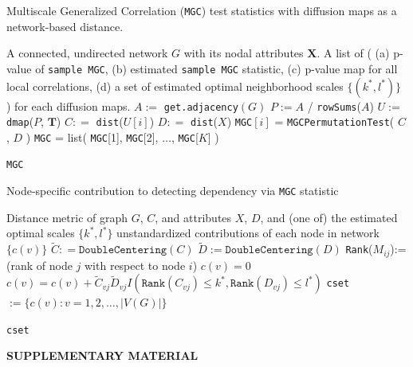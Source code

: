 \documentclass[11pt]{article}
\theoremstyle{definition}
\begin{document}
\begin{algorithm}[H]
	\caption{Multiscale Generalized Correlation (\texttt{MGC}) test statistics with diffusion maps as a network-based distance.}
	\begin{algorithmic}[1]
		\Require A connected, undirected network $G$ with its nodal attributes $\mathbf{X}$.
		\Ensure A list of \big(  (a) p-value of \texttt{sample MGC}, (b) estimated \texttt{sample MGC} statistic, (c) p-value map for all local correlations, (d) a set of estimated optimal neighborhood scales $\{  (k^{*}, l^{*}  ) \}$  \big) for each diffusion maps.
		\State $A :=$ \texttt{get.adjacency}$(G)$
		\State $P := A $ / \texttt{rowSums}($A$) 
		\State $U :=$ \texttt{dmap}($P$, $\mathbf{T}$) 
		\Begin
		\State $C : =$  \texttt{dist}($U[i]$) 
		\State $D : =$ \texttt{dist}($X$) 
		\State \texttt{MGC}$[i]$ = \texttt{MGCPermutationTest}( $C$, $D$ ) 
		\End
		\EndFor
		\State \texttt{MGC} = list( \texttt{MGC}[1], \texttt{MGC}[2], $\ldots$, \texttt{MGC}[$K$]  )
		
		\Return \texttt{MGC}
		\EndFunction
	\end{algorithmic}
\end{algorithm}

\begin{algorithm}[H]
	\caption{Node-specific contribution to detecting dependency via \texttt{MGC} statistic}
	\begin{algorithmic}[1]
		\Require Distance metric of graph $G$, $C$, and attributes $X$, $D$, and (one of) the estimated optimal scales $\{ k^{*}, l^{*} \}$ 
		\Ensure  unstandardized contributions of each node in network $\{  c(v) \}$
		\State $\tilde{C} : = \texttt{DoubleCentering}(C)$
		\State $\tilde{D} := \texttt{DoubleCentering}(D)$
		\State \texttt{Rank}($M_{ij}$):= (rank of node $j$ with respect to node $i$)
		 
		\State $c(v) = 0$
		\Begin
		\State $c(v) =  c(v) + \tilde{C}_{vj} \tilde{D}_{v j} I(  \texttt{Rank}(C_{vj})  \leq k^{*}, \texttt{Rank}(D_{vj}) \leq l^{*} )$
		\End
		\EndFor
		\EndFor
		\State \texttt{cset} $:= \{ c(v) : v = 1,2, \ldots , |V(G)|  \}$	
		
		\Return  \texttt{cset}
		\EndFunction
	\end{algorithmic}
\end{algorithm}
\bigskip
\begin{center}
	{\large\bf SUPPLEMENTARY MATERIAL}
\end{center}
\end{document}
